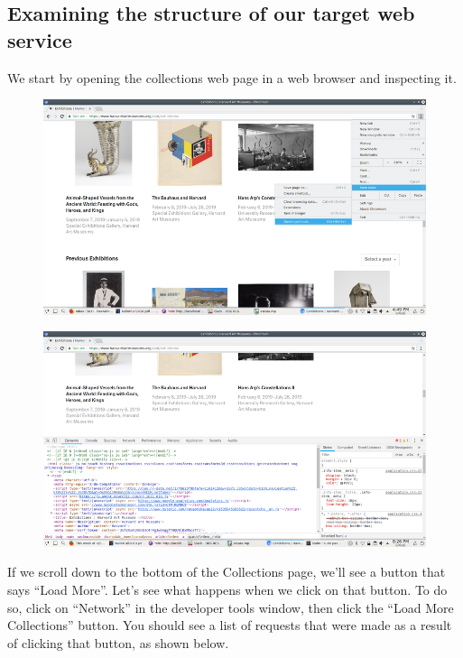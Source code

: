 \documentclass[]{book}
\begin{document}
\subsection{Examining the structure of our target web
service}\label{examining-the-structure-of-our-target-web-service}

We start by opening the collections web page in a web browser and
inspecting it.

\begin{figure}
\centering
\includegraphics{Python/PythonWebScrape/images/dev_tools.png}
\caption{}
\end{figure}

\begin{figure}
\centering
\includegraphics{Python/PythonWebScrape/images/dev_tools_pane.png}
\caption{}
\end{figure}

If we scroll down to the bottom of the Collections page, we'll see a
button that says ``Load More''. Let's see what happens when we click on
that button. To do so, click on ``Network'' in the developer tools
window, then click the ``Load More Collections'' button. You should see
a list of requests that were made as a result of clicking that button,
as shown below.
\end{document}
